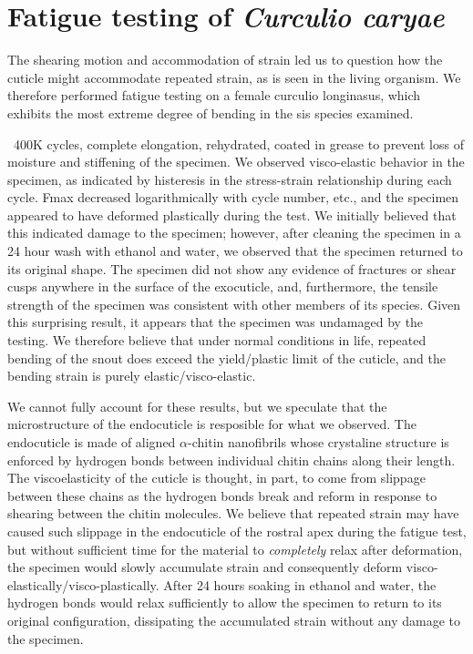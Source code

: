 \documentclass[twocolumn, linenumbers, superscriptaddress]{revtex4-1}
\begin{document}
			
		
	\section{Fatigue testing of \textit{Curculio caryae}} %
		The shearing motion and accommodation of strain led us to question how the cuticle might accommodate repeated strain, as is seen in the living organism.
		We therefore performed fatigue testing on a female curculio longinasus, which exhibits the most extreme degree of bending in the sis species examined.
			
		~400K cycles, complete elongation, rehydrated, coated in grease to prevent loss of moisture and stiffening of the specimen.
		We observed visco-elastic behavior in the specimen, as indicated by histeresis in the stress-strain relationship during each cycle.
		Fmax decreased logarithmically with cycle number, etc., and the specimen appeared to have deformed plastically during the test.
		We initially believed that this indicated damage to the specimen; however, after cleaning the specimen in a 24 hour wash with ethanol and water, we observed that the specimen returned to its original shape.
		The specimen did not show any evidence of fractures or shear cusps anywhere in the surface of the exocuticle, and, furthermore, the tensile strength of the specimen was consistent with other members of its species.
		Given this surprising result, it appears that the specimen was undamaged by the testing.
		We therefore believe that under normal conditions in life, repeated bending of the snout does exceed the yield/plastic limit of the cuticle, and the bending strain is purely elastic/visco-elastic.
		
		We cannot fully account for these results, but we speculate that the microstructure of the endocuticle is resposible for what we observed.
		The endocuticle is made of aligned $\alpha$-chitin nanofibrils whose crystaline structure is enforced by hydrogen bonds between individual chitin chains along their length.
		The viscoelasticity of the cuticle is thought, in part, to come from slippage between these chains as the hydrogen bonds break and reform in response to shearing between the chitin molecules.
		We believe that repeated strain may have caused such slippage in the endocuticle of the rostral apex during the fatigue test, but without sufficient time for the material to \textit{completely} relax after deformation, the specimen would slowly accumulate strain and consequently deform visco-elastically/visco-plastically.
		After 24 hours soaking in ethanol and water, the hydrogen bonds would relax sufficiently to allow the specimen to return to its original configuration, dissipating the accumulated strain without any damage to the specimen.
\end{document}
